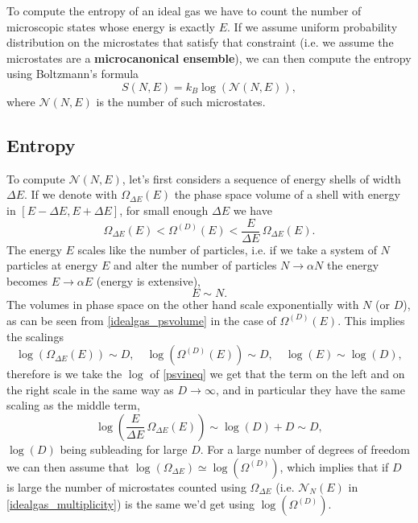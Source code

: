 \documentclass[12pt]{article}
\numberwithin{equation}{section} %
\begin{document}
To compute the entropy of an ideal gas we have to count the number of microscopic states whose energy is exactly $E$. If we assume uniform probability distribution on the microstates that satisfy that constraint (i.e. we assume the microstates are a \textbf{microcanonical ensemble}), we can then compute the entropy using Boltzmann's formula
\begin{equation}
\label{boltzmann_entropy}
S(N, E) = k_B\log\left(\mathcal{N}(N, E)\right),
\end{equation}
where $\mathcal{N}(N, E)$ is the number of such microstates.

\subsection{Entropy}
To compute $\mathcal{N}(N, E)$, let's first considers a sequence of energy shells of width $\Delta E$. If we denote with $\Omega_{\Delta E}(E)$ the phase space volume of a shell with energy in $\left[ E-\Delta E, E+\Delta E\right]$, for small enough $\Delta E$ we have
\begin{equation}
\label{psvineq}
\Omega_{\Delta E}(E) < \Omega^{(D)}(E) < \frac{E}{\Delta E}\,\Omega_{\Delta E}(E).
\end{equation}
The energy $E$ scales like the number of particles, i.e. if we take a system of $N$ particles at energy $E$ and alter the number of particles $N\to\alpha N$ the energy becomes $E\to\alpha E$ (energy is extensive),
\begin{equation}
E \sim N.
\end{equation}
The volumes in phase space on the other hand scale exponentially with $N$ (or $D$), as can be seen from \eqref{idealgas_psvolume} in the case of $\Omega^{(D)}(E)$. This implies the scalings
\begin{equation}
\log\left( \Omega_{\Delta E}(E) \right) \sim D,\quad \log\left( \Omega^{(D)}(E) \right) \sim D,\quad \log\left( E \right) \sim \log(D),
\end{equation}
therefore is we take the $\log$ of \eqref{psvineq} we get that the term on the left and on the right scale in the same way as $D\to\infty$, and in particular they have the same scaling as the middle term,
\begin{equation}
\log\left(\frac{E}{\Delta E}\,\Omega_{\Delta E}(E)\right) \sim \log(D) + D \sim D,
\end{equation}
$\log(D)$ being subleading for large $D$. For a large number of degrees of freedom we can then assume that $\log\left(\Omega_{\Delta E}\right) \simeq \log\left(\Omega^{(D)}\right)$, which implies that if $D$ is large the number of microstates counted using $\Omega_{\Delta E}$ (i.e. $\mathcal{N}_N(E)$ in \eqref{idealgas_multiplicity}) is the same we'd get using $\log\left(\Omega^{(D)}\right)$.
\end{document}
